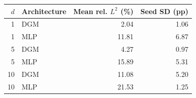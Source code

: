 \begin{tabular}{rlrr}
\toprule
$d$ & Architecture & Mean rel. $L^2$ (\%) & Seed SD (pp) \\
\midrule
1 & DGM & 2.04 & 1.06 \\
1 & MLP & 11.81 & 6.87 \\
5 & DGM & 4.27 & 0.97 \\
5 & MLP & 15.89 & 5.31 \\
10 & DGM & 11.08 & 5.20 \\
10 & MLP & 21.53 & 1.25 \\
\bottomrule
\end{tabular}

